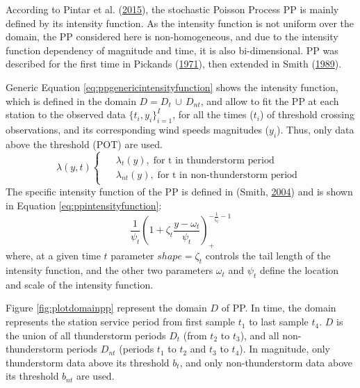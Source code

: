 \documentclass[12pt,oneside]{reedthesis}
\begin{document}
According to Pintar et al. (\protect\hyperlink{ref-Pintar2015}{2015}), the stochastic Poisson Process PP is mainly defined by its intensity function. As the intensity function is not uniform over the domain, the PP considered here is non-homogeneous, and due to the intensity function dependency of magnitude and time, it is also bi-dimensional. PP was described for the first time in Pickands (\protect\hyperlink{ref-Pickands1971}{1971}), then extended in Smith (\protect\hyperlink{ref-Smith1989}{1989}).

Generic Equation \eqref{eq:ppgenericintensityfunction} shows the intensity function, which is defined in the domain \(D = D_t\,{\cup}\,D_{nt}\), and allow to fit the PP at each station to the observed data \(\{t_i, y_i\}_{i=1}^I\), for all the times (\(t_i\)) of threshold crossing observations, and its corresponding wind speeds magnitudes (\(y_i\)). Thus, only data above the threshold (POT) are used.
\begin{equation}
    \lambda\left(y,t\right)
    \begin{cases}
      \begin{aligned}
            &\lambda_t(y),\;\textrm{for t in thunderstorm period}
            \\
            &\lambda_{nt}(y),\;\textrm{for t in non-thunderstorm period}      
      \end{aligned}
    \end{cases}
  \label{eq:ppgenericintensityfunction}
\end{equation}
The specific intensity function of the PP is defined in (Smith, \protect\hyperlink{ref-Smith2004}{2004}) and is shown in Equation \eqref{eq:ppintensityfunction}:
\begin{equation}
    \frac{1}{\psi_t}\left(1+\zeta_t\frac{y-\omega_t}{\psi_t}\right)_+^{-\frac{1}{\zeta_t}-1}
  \label{eq:ppintensityfunction}
\end{equation}
where, at a given time \(t\) parameter \(shape = \zeta_t\) controls the tail length of the intensity function, and the other two parameters \(\omega_t\) and \(\psi_t\) define the location and scale of the intensity function.

Figure \ref{fig:plotdomainpp} represent the domain \(D\) of PP. In time, the domain represents the station service period from first sample \(t_1\) to last sample \(t_4\). \(D\) is the union of all thunderstorm periods \(D_t\) (from \(t_2\) to \(t_3\)), and all non-thunderstorm periods \(D_{nt}\) (periods \(t_1\) to \(t_2\) and \(t_3\) to \(t_4\)). In magnitude, only thunderstorm data above its threshold \(b_t\), and only non-thunderstorm data above its threshold \(b_{nt}\) are used.
\end{document}
